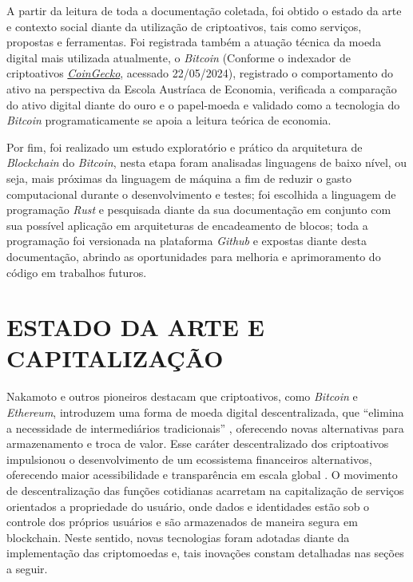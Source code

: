 \documentclass[article,12pt,oneside,a4paper,english,brazil]{unifil}
\begin{document}
\begin{Spacing}{1.5}
A partir da leitura de toda a documentação coletada, foi obtido o estado da arte e contexto social diante da utilização de criptoativos, tais como serviços, propostas e ferramentas. Foi registrada também a atuação técnica da moeda digital mais utilizada atualmente, o \textit{Bitcoin} (Conforme o indexador de criptoativos \href{https://www.coingecko.com/pt}{\textit{CoinGecko}}, acessado 22/05/2024), registrado o comportamento do ativo na perspectiva da Escola Austríaca de Economia, verificada a comparação do ativo digital diante do ouro e o papel-moeda e validado como a tecnologia do \textit{Bitcoin} programaticamente se apoia a leitura teórica de economia.

Por fim, foi realizado um estudo exploratório e prático da arquitetura de \textit{Blockchain} do \textit{Bitcoin}, nesta etapa foram analisadas linguagens de baixo nível, ou seja, mais próximas da linguagem de máquina a fim de reduzir o gasto computacional durante o desenvolvimento e testes; foi escolhida a linguagem de programação \textit{Rust} e pesquisada diante da sua documentação em conjunto com sua possível aplicação em arquiteturas de encadeamento de blocos; toda a programação foi versionada na plataforma \textit{Github} e expostas diante desta documentação, abrindo as oportunidades para melhoria e aprimoramento do código em trabalhos futuros.  



% 

\section*{ESTADO DA ARTE E CAPITALIZAÇÃO}
Nakamoto e outros pioneiros destacam que criptoativos, como \textit{Bitcoin} e \textit{Ethereum}, introduzem uma forma de moeda digital descentralizada, que ``elimina a necessidade de intermediários tradicionais'' \cite{nakamoto2008bitcoin}, oferecendo novas alternativas para armazenamento e troca de valor. Esse caráter descentralizado dos criptoativos impulsionou o desenvolvimento de um ecossistema financeiros alternativos, oferecendo maior acessibilidade e transparência em escala global \cite{schar2021defi}. O movimento de descentralização das funções cotidianas acarretam na capitalização de serviços orientados a propriedade do usuário, onde dados e identidades estão sob o controle dos próprios usuários e são armazenados de maneira segura em blockchain. Neste sentido, novas tecnologias foram adotadas diante da implementação das criptomoedas e, tais inovações constam detalhadas nas seções a seguir.


\end{Spacing}
\end{document}
